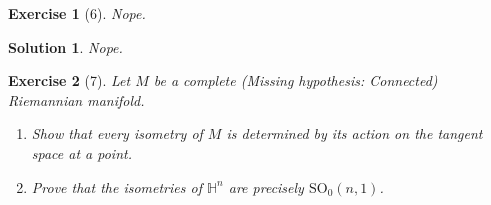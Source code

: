 \documentclass{article}
\theoremstyle{plain}
\newtheorem*{ex}{Exercise}
\theoremstyle{nonumberplain}
\newtheorem{sol}{Solution}
\newcommand{\HH}{\mathbb{H}}
\newcommand{\SO}{\mathrm{SO}}
\begin{document}
\begin{ex}[6]
Nope.
\end{ex}

\begin{sol}
Nope.
\end{sol}

\begin{ex}[7]
Let $M$ be a complete (Missing hypothesis: Connected) Riemannian manifold.
\begin{enumerate}
\item Show that every isometry of $M$ is determined by its action on the tangent space at a point.
\item Prove that the isometries of $\HH^n$ are precisely $\SO_0(n,1)$.
\end{enumerate}
\end{ex}
\end{document}
